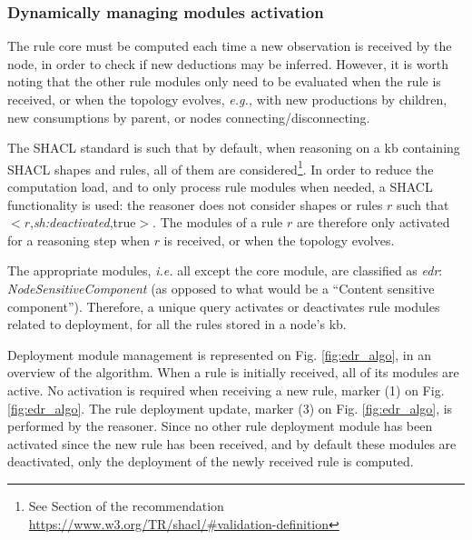 \documentclass[sw]{iosart2x}
\newcommand{\namespace}[1]{\textit{#1$:$}}
\newcommand{\concept}[2]{\namespace{#1}\-\textit{#2}}
\newcommand{\triplet}[3]{$<$#1,\textit{#2},#3$>$}
\begin{document}
%	


\subsubsection{Dynamically managing modules activation}

The rule core must be computed each time a new observation is received by the node, in order to check if new deductions may be inferred.
However, it is worth noting that the other rule modules only need to be evaluated when the rule is received, or when the topology evolves, \textit{e.g.,} with new productions by children, new consumptions by parent, or nodes connecting/disconnecting.

The SHACL standard is such that by default, when reasoning on a \gls{kb} containing SHACL shapes and rules, all of them are considered\footnote{See Section  of the recommendation \url{https://www.w3.org/TR/shacl/\#validation-definition}}.
In order to reduce the computation load, and to only process rule modules when needed, a SHACL functionality is used: the reasoner does not consider shapes or rules $r$ such that \triplet{$r$}{sh:deactivated}{true}.
The modules of a rule $r$ are therefore only activated for a reasoning step when $r$ is received, or when the topology evolves.

The appropriate modules, \textit{i.e.} all except the core module, are classified as \concept{edr}{Node\-Sensitive\-Component} (as opposed to what would be a ``Content sensitive component'').
Therefore, a unique query activates or deactivates rule modules related to deployment, for all the rules stored in a node's \gls{kb}.

Deployment module management is represented on Fig. \ref{fig:edr_algo}, in an overview of the algorithm.
When a rule is initially received, all of its modules are active. 
No activation is required when receiving a new rule, marker (1) on Fig. \ref{fig:edr_algo}. 
The rule deployment update, marker (3) on Fig. \ref{fig:edr_algo}, is performed by the reasoner.
Since no other rule deployment module has been activated since the new rule has been received, and by default these modules are deactivated, only the deployment of the newly received rule is computed.
\end{document}
